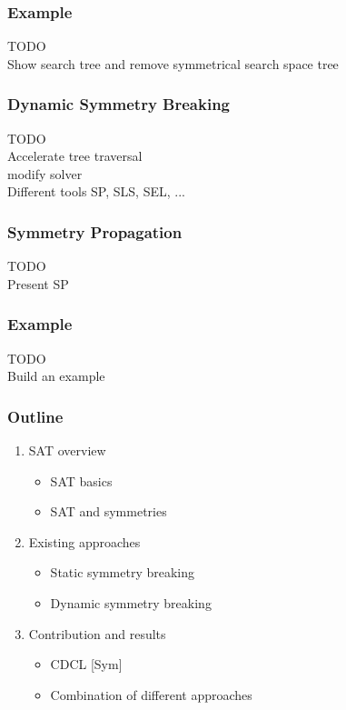 \documentclass{beamer}
\begin{document}
\begin{frame}
\frametitle{Example}
TODO\\

Show search tree and remove symmetrical search space tree

\end{frame}

\begin{frame}
\frametitle{Dynamic Symmetry Breaking}
TODO\\

Accelerate tree traversal\\

modify solver \\

Different tools SP, SLS, SEL, ...
\end{frame}
\begin{frame}
\frametitle{Symmetry Propagation}
TODO\\
Present SP
\end{frame}

\begin{frame}
\frametitle{Example}
TODO\\
Build an example
\end{frame}

\begin{frame}
\frametitle{Outline}
\begin{enumerate}
	\item \textcolor{UPMCEngagementBlueB}{SAT overview}
	\begin{itemize}
		\item[] SAT basics
		\item[] SAT and symmetries
	\end{itemize}
	\vspace{5pt}
	\item \textcolor{UPMCEngagementBlueB}{Existing approaches}
	\begin{itemize}
		\item[] Static symmetry breaking
		\item[] Dynamic symmetry breaking
	\end{itemize}
	\vspace{5pt}
	\item \textcolor{UPMCEngagementBlueB}{Contribution and results} 
	\begin{itemize}
		\item[] CDCL [Sym]
		\item[] Combination of different approaches
	\end{itemize}
\end{enumerate}
\end{frame}
\end{document}
